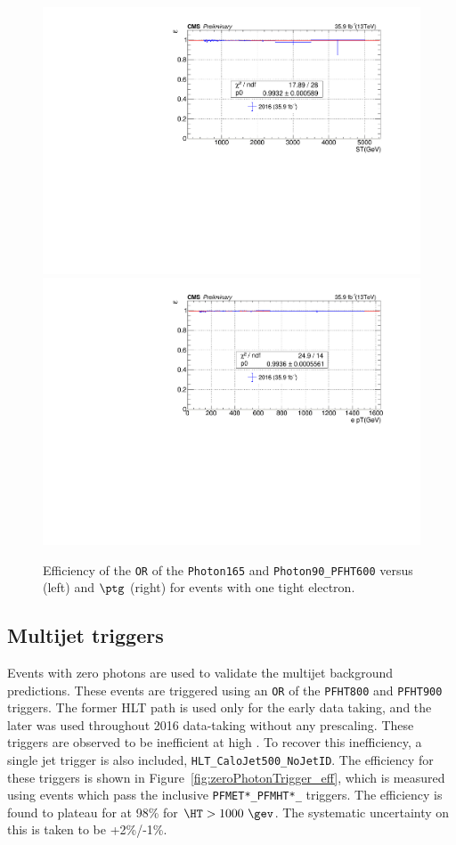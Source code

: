 \begin{figure}[htbp!]
  \centering
  \includegraphics[width=0.48\linewidth]{../Figures/Chap3/triggers/signalRegionTrigger_eff_versusST_tightEle.pdf}
  \includegraphics[width=0.48\linewidth]{../Figures/Chap3/triggers/signalRegionTrigger_eff_versusPt_tightEle.pdf}
  \captionsetup{width=.9\linewidth}
  \caption{Efficiency of the \texttt{OR} of the \texttt{Photon165} and \texttt{Photon90\_PFHT600} versus \ST (left) and $\ptg$ 
    (right) for events with one tight electron.}
  \label{fig:signalTrigger_tightEle}
\end{figure}

\subsection{Multijet triggers}

Events with zero photons are used to validate the multijet background predictions.  These
events are triggered using an \texttt{OR} of the \texttt{PFHT800} and \texttt{PFHT900} 
triggers. The former HLT path is used only for the early data taking, and the later was 
used throughout 2016 data-taking without any prescaling. These triggers are observed to
be inefficient at high \HT. To recover this inefficiency, a single jet trigger is 
also included, \texttt{HLT\_CaloJet500\_NoJetID}.
The efficiency for these triggers is shown in Figure~\ref{fig:zeroPhotonTrigger_eff}, which is 
measured using events which 
pass the inclusive \texttt{PFMET*\_PFMHT*\_} triggers.  The efficiency is found to plateau
for at 98\% for $\HT>1000~\gev$.  The systematic uncertainty on this is taken to be +2\%/-1\%. 

